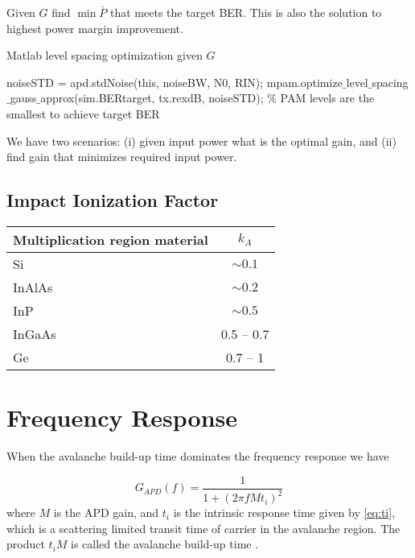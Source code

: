 \documentclass[a4paper]{article}
\begin{document}
Given $G$ find $\min\bar{P}$ that meets the target BER. This is also the solution to highest power margin improvement.

\begin{algorithm}
\caption{Matlab level spacing optimization given $G$}
\label{level-space-opt-given-G}
\begin{algorithmic}[1]
\State noiseSTD = apd.stdNoise(this, noiseBW, N0, RIN);
\State mpam.optimize$\_$level$\_$spacing$\_$gauss$\_$approx(sim.BERtarget, tx.rexdB, noiseSTD); $\%$ PAM levels are the smallest to achieve target BER
\end{algorithmic}
\end{algorithm}

We have two scenarios: (i) given input power what is the optimal gain, and (ii) find gain that minimizes required input power.

\subsection{Impact Ionization Factor}
\begin{table}[t]
	\centering
	\begin{tabular}{p{3cm}|c}
		\hline
		Multiplication region material & $k_A$\\
		\hline
		Si & $\sim 0.1$ \\
		InAlAs & $\sim 0.2$ \\
		InP & $\sim 0.5$ \\
		InGaAs & 0.5 -- 0.7 \\
		Ge & 0.7 -- 1 \\
		\hline
	\end{tabular}
\end{table}

\section{Frequency Response}

When the avalanche build-up time dominates the frequency response we have \cite{}

\begin{equation}
G_{APD}(f) = \frac{1}{1 + (2\pi fMt_i)^2}
\end{equation}
where $M$ is the APD gain, and $t_i$ is the intrinsic response time given by \eqref{eq:ti}, which is a scattering limited transit time of carrier in the avalanche region. The product $t_iM$ is called the avalanche build-up time \cite{frequency-reponse-InP-InGaAs}.
\end{document}
